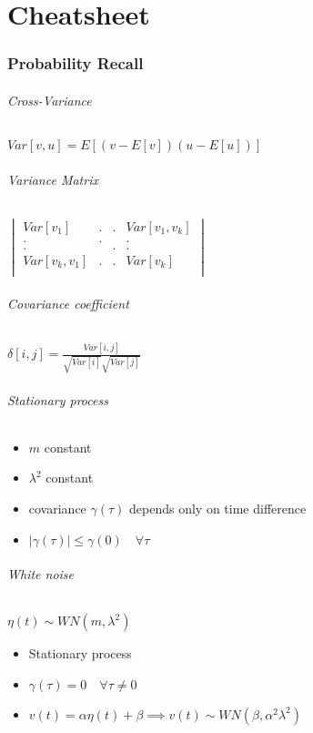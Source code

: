 \documentclass{article}
\begin{document}
\newpage
\part{Cheatsheet}
\section{Probability Recall}
\paragraph{Cross-Variance}
$Var[v,u]=E[(v-E[v])(u-E[u])]$
\paragraph{Variance Matrix}
$\begin{vmatrix}
	Var[v_1]			&	.	&	.	&	Var[v_1,v_k]		\\
		.			&	.	&		&		.			\\
		.			&		&	.	&		.			\\
	Var[v_k,v_1]		&	.	&	.	&	Var[v_k]			\\
				
\end{vmatrix}$
\paragraph{Covariance coefficient}
	$\delta[i,j]=\frac{Var[i,j]}{\sqrt{Var[i]}\sqrt{Var[j]}}$
\paragraph{Stationary process}
\begin{itemize}
	\item $m$ constant
	\item $\lambda^2$ constant
	\item covariance $\gamma(\tau)$ depends only on time difference
	\item $|\gamma(\tau)|\leq\gamma(0)		\quad\forall\tau$
\end{itemize}
\paragraph{White noise} $\eta(t)\sim WN(m,\lambda^2)$
\begin{itemize}
	\item Stationary process
	\item $\gamma(\tau)=0	\quad\forall\tau\neq0$
	\item $v(t)=\alpha \eta (t)+\beta\implies v(t)\sim WN(\beta,\alpha^2 \lambda^2)$
\end{itemize}
\end{document}
